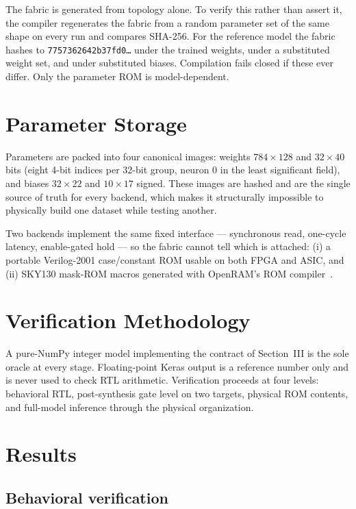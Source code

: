\documentclass[conference]{IEEEtran}
\begin{document}
The fabric is generated from topology alone. To verify this rather than assert
it, the compiler regenerates the fabric from a random parameter set of the same
shape on every run and compares SHA-256. For the reference model the fabric
hashes to \texttt{7757362642b37fd0\ldots} under the trained weights, under a
substituted weight set, and under substituted biases. Compilation fails closed
if these ever differ. Only the parameter ROM is model-dependent.

\section{Parameter Storage}

Parameters are packed into four canonical images: weights $784{\times}128$ and
$32{\times}40$ bits (eight 4-bit indices per 32-bit group, neuron 0 in the
least significant field), and biases $32{\times}22$ and $10{\times}17$ signed.
These images are hashed and are the single source of truth for every backend,
which makes it structurally impossible to physically build one dataset while
testing another.

Two backends implement the same fixed interface --- synchronous read, one-cycle
latency, enable-gated hold --- so the fabric cannot tell which is attached:
(i) a portable Verilog-2001 case/constant ROM usable on both FPGA and ASIC, and
(ii) SKY130 mask-ROM macros generated with OpenRAM's ROM compiler~\cite{openram}.

\section{Verification Methodology}

A pure-NumPy integer model implementing the contract of Section~III is the sole
oracle at every stage. Floating-point Keras output is a reference number only
and is never used to check RTL arithmetic. Verification proceeds at four
levels: behavioral RTL, post-synthesis gate level on two targets, physical ROM
contents, and full-model inference through the physical organization.

\section{Results}

\subsection{Behavioral verification}
\end{document}
